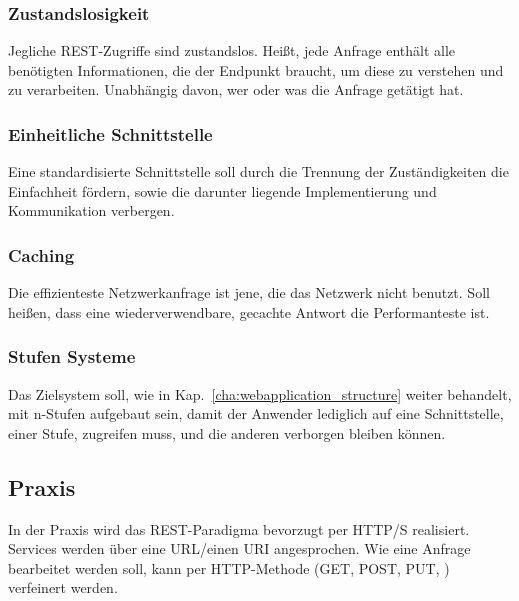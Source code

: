 \subsubsection{Zustandslosigkeit}
Jegliche REST-Zugriffe sind zustandslos. Heißt, jede Anfrage enthält alle benötigten Informationen, die der Endpunkt braucht, um diese zu verstehen und zu verarbeiten. Unabhängig davon, wer oder was die Anfrage getätigt hat.  
\subsubsection{Einheitliche Schnittstelle}
Eine standardisierte Schnittstelle soll durch die Trennung der Zuständigkeiten die Einfachheit fördern, sowie die darunter liegende Implementierung und Kommunikation verbergen. 
\subsubsection{Caching}
Die effizienteste Netzwerkanfrage ist jene, die das Netzwerk nicht benutzt.
Soll heißen, dass eine wiederverwendbare, gecachte Antwort die Performanteste ist. 
\subsubsection{Stufen Systeme}
Das Zielsystem soll, wie in Kap.~\ref{cha:webapplication_structure} weiter behandelt, mit n-Stufen aufgebaut sein, damit der Anwender lediglich auf eine Schnittstelle, einer Stufe, zugreifen muss, und die anderen verborgen bleiben können.

\subsection{Praxis}
In der Praxis wird das REST-Paradigma bevorzugt per HTTP/S realisiert. Services werden über eine URL/einen URI angesprochen. Wie eine Anfrage bearbeitet werden soll, kann per HTTP-Methode (GET, POST, PUT, \etc) verfeinert werden. 